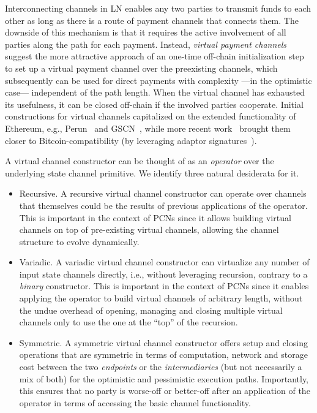 Interconnecting channels in LN enables any two parties to transmit funds
to each other as long as there is a route of payment channels that connects
them. The downside of this mechanism is that it requires the active involvement
of all parties along the path for each payment. Instead, \emph{virtual payment
channels} suggest the more attractive approach of an one-time off-chain
initialization step to set up a virtual payment channel over the preexisting
channels, which subsequently can
be used for direct payments with complexity ---in the optimistic case---
independent of the path length. When the virtual channel has exhausted
its usefulness, it can be closed off-chain if the involved parties cooperate.
Initial constructions for virtual channels capitalized on the extended functionality of Ethereum, e.g.,
Perun~\cite{perun} and GSCN~\cite{DBLP:conf/ccs/DziembowskiFH18}, while more
recent work~\cite{9519487} brought them closer to
Bitcoin-compatibility (by leveraging adaptor
signatures~\cite{DBLP:journals/iacr/AumayrEEFHMMR20}).

A virtual channel constructor can be thought of as an \emph{operator} over the
underlying state channel primitive. We identify three natural
desiderata for it.

\begin{itemize}
\item Recursive. A recursive virtual channel constructor can operate over
channels that themselves could be the results of previous applications of the
operator. This is important in the context of PCNs since it allows building
virtual channels on top of pre-existing virtual channels, allowing the channel
structure to evolve dynamically.
\item Variadic. A variadic virtual channel constructor can virtualize any number
of input state channels directly, i.e., without leveraging recursion, contrary to a \emph{binary} constructor. This is
important in the context of PCNs since it enables applying the operator to build
virtual channels of arbitrary length, without the undue overhead of opening,
managing and closing multiple virtual channels only to use the one at the
``top'' of the recursion.
\item Symmetric. A symmetric virtual channel constructor offers setup and
closing operations that are symmetric in terms of computation, network and storage cost between the two
\emph{endpoints} or the \emph{intermediaries} (but not necessarily
a mix of both) for the
optimistic and pessimistic execution paths. Importantly, this ensures that no
party is worse-off or better-off after an application of the operator in terms
of accessing the basic channel functionality.
\end{itemize}

